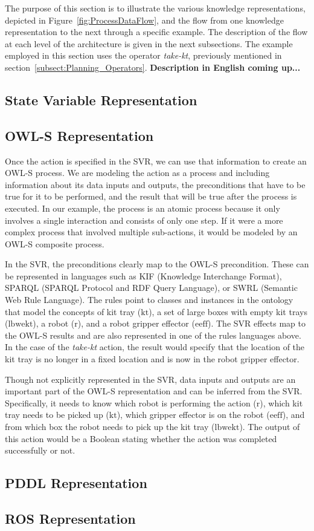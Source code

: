 The purpose of this section is to illustrate the various knowledge representations, depicted in Figure~\ref{fig:ProcessDataFlow}, and the flow from one knowledge representation to the next through a specific example. The description of the flow at each level of the architecture is given in the next subsections.
The example employed in this section uses the operator \textsl{take-kt}, previously mentioned in section~\ref{subsect:Planning_Operators}. \textbf{Description in English coming up...}

\subsection{State Variable Representation}


\subsection{OWL-S Representation}
Once the action is specified in the SVR, we can use that information to create an OWL-S process. We are modeling the action as a process and including information about its data inputs and outputs, the preconditions that have to be true for it to be performed, and the result that will be true after the process is executed. In our example, the process is an atomic process because it only involves a single interaction and consists of only one step. If it were a more complex process that involved multiple sub-actions, it would be modeled by an OWL-S composite process.

In the SVR, the preconditions clearly map to the OWL-S precondition. These can be represented in languages such as KIF \cite{KIF} (Knowledge Interchange Format), SPARQL \cite{SPARQL} (SPARQL Protocol and RDF Query Language), or SWRL \cite{SWRL-W3C} (Semantic Web Rule Language). The rules point to classes and instances in the ontology that model the concepts of kit tray ($\mathrm{kt}$), a set of large boxes with empty kit trays ($\mathrm{lbwekt}$), a robot ($\mathrm{r}$), and a robot gripper effector ($\mathrm{eeff}$). The SVR effects map to the OWL-S results and are also represented in one of the rules languages above. In the case of the \textsl{take-kt} action, the result would specify that the location of the kit tray is no longer in a fixed location and is now in the robot gripper effector.

Though not explicitly represented in the SVR, data inputs and outputs are an important part of the OWL-S representation and can be inferred from the SVR. Specifically, it needs to know which robot is performing the action ($\mathrm{r}$), which kit tray needs to be picked up ($\mathrm{kt}$), which gripper effector is on the robot ($\mathrm{eeff}$), and from which box the robot needs to pick up the kit tray ($\mathrm{lbwekt}$). The output of this action would be a Boolean stating whether the action was completed successfully or not. 

\subsection{PDDL Representation}

\subsection{ROS Representation}
